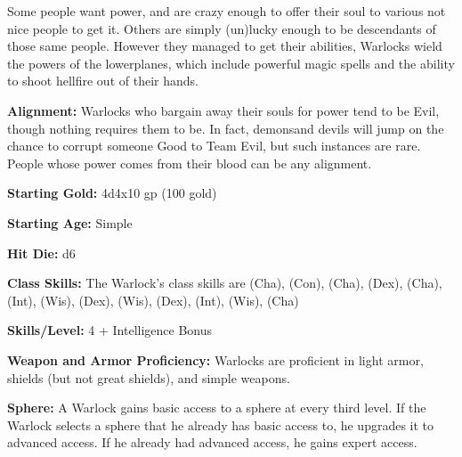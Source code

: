 
Some people want power, and are crazy enough to offer their soul to various not nice people to get it. Others are simply (un)lucky enough to be descendants of those same people. However they managed to get their abilities, Warlocks wield the powers of the lowerplanes, which include powerful magic spells and the ability to shoot hellfire out of their hands.

\textbf{Alignment:} Warlocks who bargain away their souls for power tend to be Evil, though nothing requires them to be. In fact, demonsand devils will jump on the chance to corrupt someone Good to Team Evil, but such instances are rare. People whose power comes from their blood can be any alignment.

\textbf{Starting Gold:} 4d4x10 gp (100 gold)

\textbf{Starting Age:} Simple

\textbf{Hit Die:} d6

\textbf{Class Skills:} The Warlock's class skills are  (Cha),  (Con),  (Cha),  (Dex),  (Cha),  (Int),  (Wis),  (Dex),  (Wis),  (Dex),  (Int),  (Wis),  (Cha)

\textbf{Skills/Level:} 4 + Intelligence Bonus

\poorbab{}
\poorfor{}
\goodref{}
\goodwil{}

\begin{classtable}
\end{classtable}

\classfeatures

\textbf{Weapon and Armor Proficiency:} Warlocks are proficient in light armor, shields (but not great shields), and simple weapons.

\textbf{Sphere:} A Warlock gains basic access to a sphere at every third level. If the Warlock selects a sphere that he already has basic access to, he upgrades it to advanced access. If he already had advanced access, he gains expert access.

